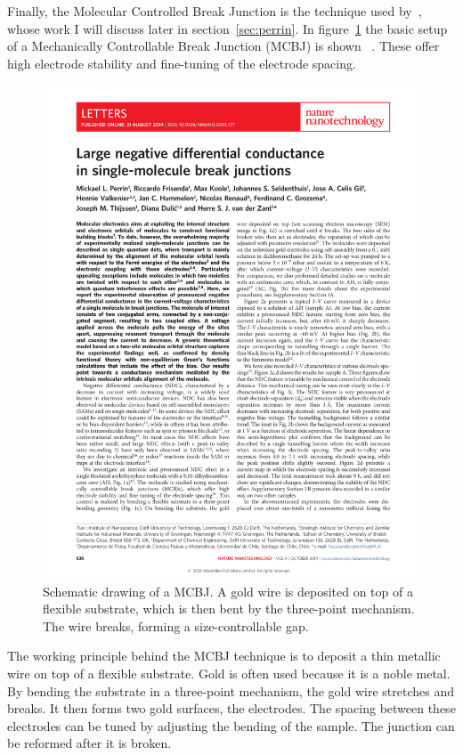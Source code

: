 Finally, the Molecular Controlled Break Junction is the technique used by~\citet{perrinnano}, whose work I will discuss later in section~\ref{sec:perrin}. In figure~\ref{fig:mcbj} the basic setup of a Mechanically Controllable Break Junction (MCBJ) is shown~\cite{perrin} . These offer high electrode stability and fine-tuning of the electrode spacing. 
\begin{figure}[!bp]
    \centering
    \includegraphics[height=0.3\textheight,page=2, clip=true, trim=2.5cm 16.5cm 11cm 6cm]{pdf/perrinnnano.pdf}
    \caption{Schematic drawing of a MCBJ. A gold wire is deposited on top of a flexible substrate, which is then bent by the three-point mechanism. The wire breaks, forming a size-controllable gap.}
    \label{fig:mcbj}
\end{figure}

The working principle behind the MCBJ technique is to deposit a thin metallic wire on top of a flexible substrate. Gold is often used because it is a noble metal. By bending the substrate in a three-point mechanism, the gold wire stretches and breaks. It then forms two gold surfaces, the electrodes. The spacing between these electrodes can be tuned by adjusting the bending of the sample. The junction can be reformed after it is broken.

